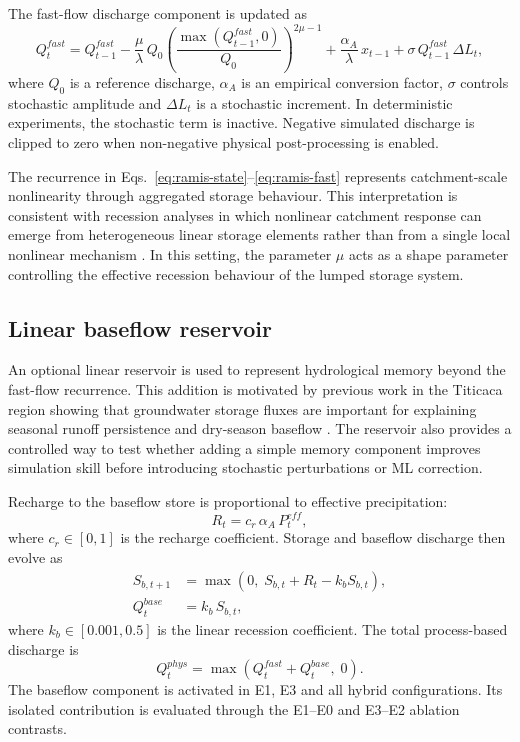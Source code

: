 The fast-flow discharge component is updated as
\begin{equation}
Q^{fast}_t = Q^{fast}_{t-1}
  - \frac{\mu}{\lambda}\,Q_0
    \left(\frac{\max(Q^{fast}_{t-1},0)}{Q_0}\right)^{2\mu-1}
  + \frac{\alpha_A}{\lambda}\,x_{t-1}
  + \sigma\,Q^{fast}_{t-1}\,\Delta L_t,
\label{eq:ramis-fast}
\end{equation}
where $Q_0$ is a reference discharge, $\alpha_A$ is an empirical
conversion factor, $\sigma$ controls stochastic amplitude and
$\Delta L_t$ is a stochastic increment. In deterministic experiments,
the stochastic term is inactive. Negative simulated discharge is clipped
to zero when non-negative physical post-processing is enabled.

The recurrence in Eqs.~\ref{eq:ramis-state}--\ref{eq:ramis-fast}
represents catchment-scale nonlinearity through aggregated storage
behaviour. This interpretation is consistent with recession analyses in
which nonlinear catchment response can emerge from heterogeneous linear
storage elements rather than from a single local nonlinear mechanism
\citep{harman2009power}. In this setting, the parameter $\mu$ acts as a
shape parameter controlling the effective recession behaviour of the
lumped storage system.

\subsection{Linear baseflow reservoir}\label{subsec:baseflow}

An optional linear reservoir is used to represent hydrological memory
beyond the fast-flow recurrence. This addition is motivated by previous
work in the Titicaca region showing that groundwater storage fluxes are
important for explaining seasonal runoff persistence and dry-season
baseflow \citep{nauditt2017conceptual}. The reservoir also provides a
controlled way to test whether adding a simple memory component improves
simulation skill before introducing stochastic perturbations or ML
correction.

Recharge to the baseflow store is proportional to effective
precipitation:
\begin{equation}
R_t = c_r\,\alpha_A\,P^{eff}_t,
\label{eq:recharge}
\end{equation}
where $c_r\in[0,1]$ is the recharge coefficient. Storage and baseflow
discharge then evolve as
\begin{align}
S_{b,t+1} &= \max\!\left(0,\;S_{b,t} + R_t - k_b S_{b,t}\right),
\label{eq:storage}\\
Q^{base}_t &= k_b\,S_{b,t},
\label{eq:qbase}
\end{align}
where $k_b\in[0.001,0.5]$ is the linear recession coefficient. The
total process-based discharge is
\begin{equation}
Q^{phys}_t = \max\!\left(Q^{fast}_t + Q^{base}_t,\;0\right).
\label{eq:qtotal}
\end{equation}
The baseflow component is activated in E1, E3 and all hybrid
configurations. Its isolated contribution is evaluated through the
E1--E0 and E3--E2 ablation contrasts.

